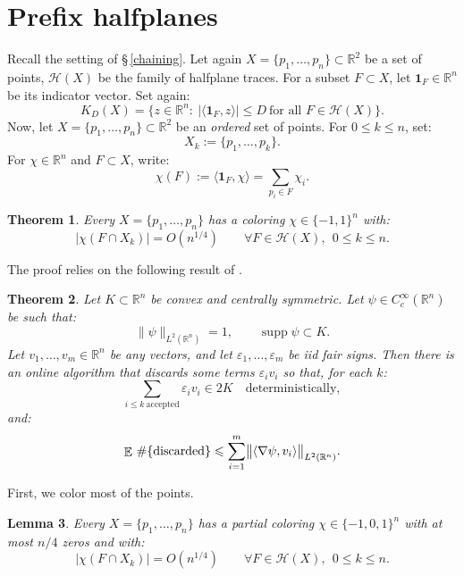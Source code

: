 \documentclass[12pt,reqno]{amsart}
\def\le{\leqslant}
\def\le{\leqslant}
\newtheorem{theorem}{Theorem}[section]
\newtheorem{lemma}[theorem]{Lemma}
\theoremstyle{remark}
\numberwithin{equation}{section}
\DeclareMathOperator{\E}{\mathbb{E}}
\newcommand{\one}{\mathbf{1}}
\def \R {\mathbb{R}}
\def \e {\varepsilon}
\begin{document}
\section{Prefix halfplanes}\label{sec:prefix}
Recall the setting of \S\,\ref{chaining}. 
Let again \(X=\{p_1,\ldots,p_n\}\subset\R^2\) be a set of points, \(\mathcal H(X)\) be the family of halfplane traces. For a subset \(F\subset X\), let \(\one_F\in\R^n\) be its 
indicator vector. Set again:
\[
K_D(X)=\bigl\{z\in\R^n:\ |\langle\one_F,z\rangle|\le D\ \text{for all }F\in\mathcal H(X)\bigr\}.
\]
Now, let \(X=\{p_1,\ldots,p_n\}\subset\R^2\) be an \emph{ordered} set of points. For \(0\le k\le n\), set:
\[
X_k:=\{p_1,\ldots,p_k\}.
\]
For \(\chi\in\R^n\) and \(F\subset X\), write:
\[
\chi(F):=\langle\one_F,\chi\rangle=\sum_{p_i\in F}\chi_i.
\]
\begin{theorem}\label{thm:prefix}
Every \(X=\{p_1,\ldots,p_n\}\) has a coloring \(\chi\in\{-1,1\}^n\) with:
\[
|\chi(F\cap X_k)|=O(n^{1/4})\qquad\forall F\in\mathcal H(X),\ \ 0\le k\le n.
\]
\end{theorem}
The proof relies on the following result of \cite{Versh-Sm-3}. 
\begin{theorem}\label{thm:SV}
Let \(K\subset\R^n\) be convex and centrally symmetric. Let \(\psi\in C_c^\infty(\R^n)\) be such that:
\[
\|\psi\|_{L^2(\R^n)}=1,\qquad 
\operatorname{supp}\psi\subset K.
\]
Let \(v_1,\ldots,v_m\in\R^n\) be any vectors, and let \(\e_1,\ldots,\e_m\) be iid fair signs. Then there is an online algorithm that discards some terms \(\e_iv_i\) so that, for each \(k\):
\[
\sum_{i\le k\ \mathrm{accepted}}\e_iv_i\in2K
\quad\text{deterministically},
\]
and:
\[
\E\,\#\{\text{\rm discarded}\}\le\sum_{i=1}^m\bigl\|\langle\nabla\psi,v_i\rangle\bigr\|_{L^2(\R^n)}.
\]
\end{theorem}
First, we color most of the points.
\begin{lemma}\label{lem:partial}
Every \(X=\{p_1,\ldots,p_n\}\) has a partial coloring \(\chi\in\{-1,0,1\}^n\) with at most \(n/4\) zeros and with:
\[
|\chi(F\cap X_k)|=O(n^{1/4})\qquad\forall F\in\mathcal H(X),\ \ 0\le k\le n.
\]
\end{lemma}
\end{document}
